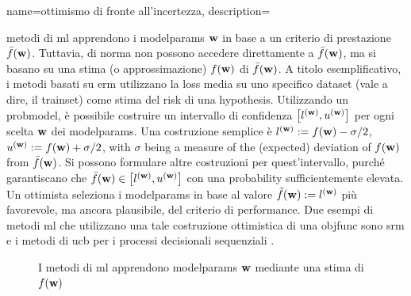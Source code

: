 {name={ottimismo di fronte all’incertezza},
	description={\I metodi di \gls{ml} apprendono i  \gls{modelparams} ${\bf w}$ 
		in base a un criterio di prestazione $\bar{f}({\bf w})$. Tuttavia, di norma non possono accedere 
		direttamente a $\bar{f}({\bf w})$, ma si basano su una stima (o approssimazione) $f({\bf w})$ di $\bar{f}({\bf w})$. 
		A titolo esemplificativo, i metodi basati su \gls{erm} utilizzano la \gls{loss} media su uno specifico 
		\gls{dataset} (vale a dire, il \gls{trainset}) come stima del \gls{risk} di una \gls{hypothesis}.		
		Utilizzando un \gls{probmodel}, è possibile costruire un intervallo di confidenza
		$\big[ l^{({\bf w})},  u^{({\bf w})} \big]$ per ogni scelta ${\bf w}$ dei \gls{modelparams}. 
		Una costruzione semplice è $l^{({\bf w})} := f({\bf w}) - \sigma/2$, $u^{({\bf w})} := f({\bf w})+ \sigma/2$, 
	    	with $\sigma$ being a measure of the (expected) deviation of $f({\bf w})$ from $\bar{f}({\bf w})$.
		Si possono formulare altre costruzioni per quest'intervallo, purché garantiscano che 
		$\bar{f}({\bf w}) \in\big[ l^{({\bf w})},  u^{({\bf w})} \big]$ 
		con una \gls{probability} sufficientemente elevata. Un ottimista seleziona i \gls{modelparams} in base al valore
		 $\tilde{f}({\bf w}) :=  l^{({\bf w})}$ più favorevole, ma ancora plausibile,
		del criterio di performance. Due esempi di metodi \gls{ml} che utilizzano una tale costruzione ottimistica 
		di una \gls{objfunc} sono \gls{srm} \cite[Ch. 11]{ShalevMLBook} e i metodi di \gls{ucb}  
		per i processi decisionali sequenziali \cite[Sec. 2.2]{Bubeck2012}. 
		\begin{figure}[H]
				\begin{center}
\caption{I metodi di \gls{ml} apprendono \gls{modelparams} ${\bf w}$ mediante una stima di $f({\bf w})$  
}
\end{center}
\end{figure}}}
